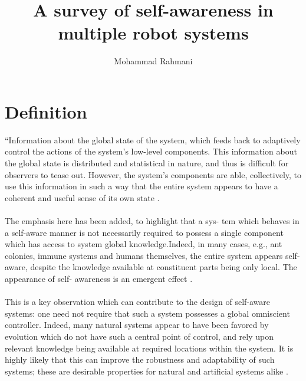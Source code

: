 \documentclass{article}
\begin{document}
	
	\title{A survey of self-awareness in multiple robot systems}
	\author{Mohammad Rahmani}
	\date{}
	\maketitle
	\section{Definition}
		“Information about the global state of the
		system, which feeds back to adaptively control the
		actions of the system’s low-level components. This
		information about the global state is distributed
		and statistical in nature, and thus is difficult for
		observers to tease out. However, the system’s
		components are able, collectively, to use this information in such a way that the entire system
		appears to have a coherent and useful sense of its
		own state \citep{mitchell-2005-self-awareness-and-control-in-decentralized-systems}.
		\paragraph{}The emphasis here has been added, to highlight that a sys-
		tem which behaves in a self-aware manner is not necessarily
		required to possess a single component which has access to
		system global knowledge.Indeed, in many cases, e.g., ant
		colonies, immune systems and humans themselves, the entire
		system appears self-aware, despite the knowledge available
		at constituent parts being only local. The appearance of self-
		awareness is an emergent effect \citet{mitchell-2005-self-awareness-and-control-in-decentralized-systems}.
		\paragraph{}This is a key observation which can contribute to the
		design of self-aware systems: one need not require that
		such a system possesses a global omniscient controller.
		Indeed, many natural systems appear to have been favored
		by evolution which do not have such a central point of
		control, and rely upon relevant knowledge being available
		at required locations within the system. It is highly likely
		that this can improve the robustness and adaptability of
		such systems; these are desirable properties for natural and
		artificial systems alike \citet{mitchell-2005-self-awareness-and-control-in-decentralized-systems}.
\end{document}
